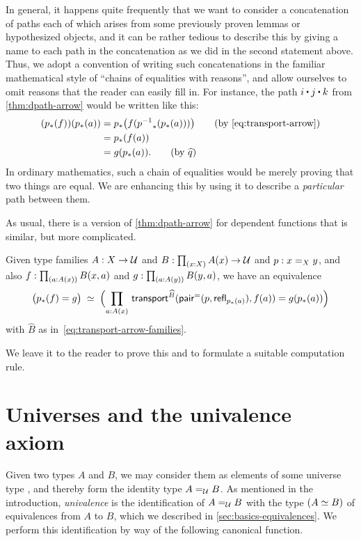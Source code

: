 In general, it happens quite frequently that we want to consider a concatenation of paths each of which arises from some previously proven lemmas or hypothesized objects, and it can be rather tedious to describe this by giving a name to each path in the concatenation as we did in the second statement above.
Thus, we adopt a convention of writing such concatenations in the familiar mathematical style of ``chains of equalities with reasons'', and allow ourselves to omit reasons that the reader can easily fill in.
For instance, the path $i\ct j\ct k$ from \cref{thm:dpath-arrow} would be written like this:
  \begin{align*}
    (\trans p f)(\trans p a)
    &= \trans p {f (\trans {\opp p}{\trans p a})}
    \tag{by~\eqref{eq:transport-arrow}}\\
    &= \trans p {f(a)}\\
    &= g(\trans p a).
    \tag{by $\widehat{q}$}
  \end{align*}
In ordinary mathematics, such a chain of equalities would be merely proving that two things are equal.
We are enhancing this by using it to describe a \emph{particular} path between them.

As usual, there is a version of \cref{thm:dpath-arrow} for dependent functions that is similar, but more complicated.

\begin{lem}\label{thm:dpath-forall}
  Given type families $A:X\to\type$ and $B:\prd{x:X} A(x)\to\type$ and $p:\id[X]xy$, and also $f:\prd{a:A(x)} B(x,a)$ and $g:\prd{a:A(y)} B(y,a)$, we have an equivalence
  \[ \eqvspaced{ \big(\trans{p}{f} = {g}\big) } { \Parens{\prd{a:A(x)}  \transfib{\widehat{B}}{\pairpath(p,\refl{\trans pa})}{f(a)} = g(\trans{p}{a}) } } \]
  with $\widehat{B}$ as in~\eqref{eq:transport-arrow-families}.
\end{lem}

We leave it to the reader to prove this and to formulate a suitable computation rule.

%
%
%

\section{Universes and the univalence axiom}
\label{sec:compute-universe}

%
%
Given two types $A$ and $B$, we may consider them as elements of some universe type \type, and thereby form the identity type $\id[\type]AB$.
As mentioned in the introduction, \emph{univalence} is the identification of $\id[\type]AB$ with the type $(\eqv AB)$ of equivalences from $A$ to $B$, which we described in \cref{sec:basics-equivalences}.
We perform this identification by way of the following canonical function.

